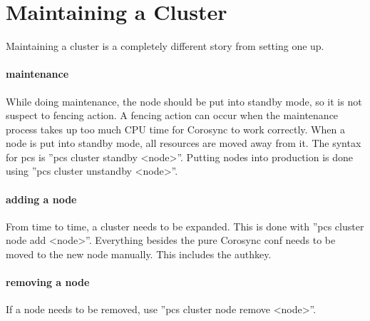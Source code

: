 


\section{Maintaining a Cluster}
Maintaining a cluster is a completely different story from setting one up.
\paragraph{maintenance}
While doing maintenance, the node should be put into standby mode, so it is not suspect
to fencing action. A fencing action can occur when the maintenance process
takes up too much CPU time for Corosync to work correctly.
When a node is put into standby mode, all resources are moved away from it.
The syntax for pcs is ''pcs cluster standby <node>''. Putting nodes
into production is done using ''pcs cluster unstandby <node>''.
\paragraph{adding a node}
From time to time, a cluster needs to be expanded.
This is done with ''pcs cluster node add <node>''.
Everything besides the pure Corosync conf needs to be moved to the new
node manually. This includes the authkey.
\paragraph{removing a node}
If a node needs to be removed, use ''pcs cluster node remove <node>''.

